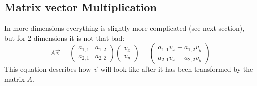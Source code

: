 \documentclass[a4paper]{report}
\begin{document}
\subsection{Matrix vector Multiplication}
In more dimensions everything is slightly more complicated (see next section), but for 2 dimensions it is not that bad:
\begin{equation}
A\vec{v} = \begin{pmatrix} a_{1,1} & a_{1,2} \\ a_{2,1} & a_{2,2} \end{pmatrix} \begin{pmatrix} v_x \\ v_y \end{pmatrix} = \begin{pmatrix} a_{1,1}v_x + a_{1,2} v_y \\ a_{2,1}v_x + a_{2,2}v_y \end{pmatrix}
\end{equation}
This equation describes how $\vec{v}$ will look like after it has been transformed by the matrix $A$.
\end{document}
